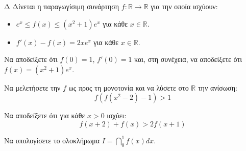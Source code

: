 \begin{thema}{Δ}
Δίνεται η παραγωγίσιμη συνάρτηση $f: \mathbb{R} \to \mathbb{R}$ για την οποία ισχύουν:
\begin{itemize}
    \item $e^x \le f(x) \le (x^2+1)e^x$ για κάθε $x \in \mathbb{R}$.
    \item $f'(x) - f(x) = 2x e^x$ για κάθε $x \in \mathbb{R}$.
\end{itemize}

\begin{erwthma}
    \item Να αποδείξετε ότι $f(0) = 1$, $f'(0) = 1$ και, στη συνέχεια, να αποδείξετε ότι $f(x) = (x^2 + 1)e^x$.
    \item Να μελετήσετε την $f$ ως προς τη μονοτονία και να λύσετε στο $\mathbb{R}$ την ανίσωση: 
    \[ f\left( f(x^2 - 2) - 1 \right) > 1 \]
    \item Να αποδείξετε ότι για κάθε $x > 0$ ισχύει: 
    \[ f(x+2) + f(x) > 2f(x+1) \]
    \item Να υπολογίσετε το ολοκλήρωμα $\displaystyle I = \dint_0^1 f(x) dx$.
\end{erwthma}
\end{thema}
